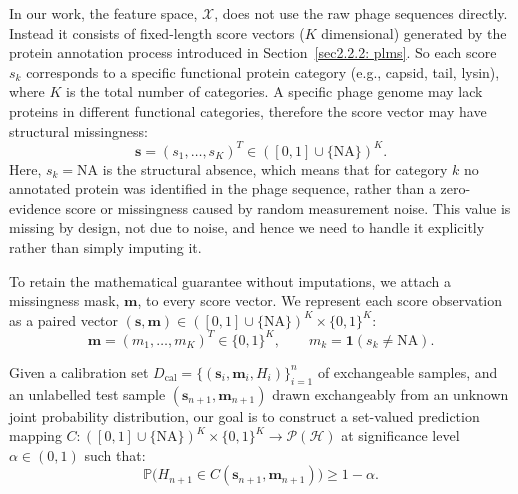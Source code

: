 In our work, the feature space, $\mathcal{X}$, does not use the raw phage sequences directly. Instead it 
consists of fixed-length score vectors ($K$ dimensional) generated by the protein annotation process introduced in 
Section~\ref{sec2.2.2: plms}. So each score $s_k$ corresponds to a specific functional protein category (e.g., capsid, 
tail, lysin), where $K$ is the total number of categories. A specific phage genome may lack proteins in different 
functional categories, therefore the score vector may have structural missingness:
\begin{equation*}
\mathbf{s} = (s_1, \ldots, s_K)^T \in ([0,1] \cup \{\text{NA}\})^K.
\end{equation*}
\noindent Here, $s_k = \text{NA}$ is the structural absence, which means that for category $k$ no annotated protein 
was identified in the phage sequence, rather than a zero-evidence score or missingness caused by random measurement noise.
This value is missing by design, not due to noise, and hence we need to handle it explicitly rather than simply imputing it.

To retain the mathematical guarantee without imputations, we attach a missingness mask, $\mathbf{m}$, to every 
score vector. We represent each score observation as a paired vector $(\mathbf{s}, \mathbf{m}) \in ([0,1] \cup 
\{\text{NA}\})^K \times \{0,1\}^K$:
\begin{equation*}
\mathbf{m} = (m_1, \ldots, m_K)^T \in \{0,1\}^K, \qquad m_k = \mathbf{1}(s_k \neq \text{NA}).
\end{equation*}

Given a calibration set $D_{\text{cal}} = \{(\mathbf{s}_i, \mathbf{m}_i, H_i)\}_{i=1}^n$ of exchangeable samples,
and an unlabelled test sample $(\mathbf{s}_{n+1}, \mathbf{m}_{n+1})$ drawn exchangeably from an unknown joint probability 
distribution, our goal is to construct a set-valued prediction mapping $C: ([0,1] \cup \{\text{NA}\})^K \times \{0,1\}^K 
\to \mathcal{P} (\mathcal{H})$ at significance level $\alpha \in (0,1)$ such that:
\begin{equation*}
\label{eq: coverage with missingness}
\mathbb{P}\Big( H_{n+1} \in C(\mathbf{s}_{n+1}, \mathbf{m}_{n+1}) \Big) \ge 1 - \alpha.
\end{equation*}

